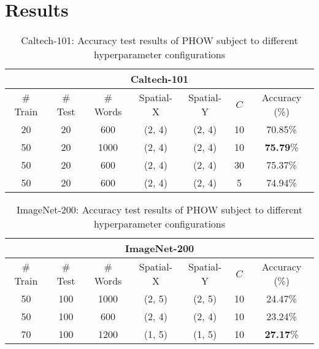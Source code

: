 \documentclass[10pt,twocolumn,letterpaper]{article}
\begin{document}
\section{Results}
\begin{table*}
	\centering
	\begin{tabular}{|c|c|c|c|c|c|c|}
		\hline
		\multicolumn{7}{|c|}{Caltech-101} \\
		\hline
		\# Train & \# Test & \# Words & Spatial-X & Spatial-Y & $C$ & Accuracy (\%) \\
		\hline
		20 & 20 & 600 & (2, 4) & (2, 4) & 10 & 70.85\% \\
		\hline
		50 & 20 & 1000 & (2, 4) & (2, 4) & 10 & \textbf{75.79}\% \\
		\hline
		50 & 20 & 600 & (2, 4) & (2, 4) & 30 & 75.37\% \\
		\hline
		50 & 20 & 600 & (2, 4) & (2, 4) & 5 & 74.94\% \\
		\hline
	\end{tabular}
	\caption{Caltech-101: Accuracy test results of PHOW subject to different hyperparameter configurations}
	\label{Tab:Cal}
\end{table*}

\begin{table*}
	\centering
	\begin{tabular}{|c|c|c|c|c|c|c|}
		\hline
		\multicolumn{7}{|c|}{ImageNet-200} \\
		\hline
		\# Train & \# Test & \# Words & Spatial-X & Spatial-Y & $C$ & Accuracy (\%) \\
		\hline
		50 & 100 & 1000 & (2, 5) & (2, 5) & 10 & 24.47\% \\
		\hline
		50 & 100 & 600 & (2, 4) & (2, 4) & 10 & 23.24\% \\
		\hline
		70 & 100 & 1200 & (1, 5) & (1, 5) & 10 & \textbf{27.17}\% \\
		\hline
	\end{tabular}
	\caption{ImageNet-200: Accuracy test results of PHOW subject to different hyperparameter configurations}
	\label{Tab:ImageNet}
\end{table*}
\end{document}
